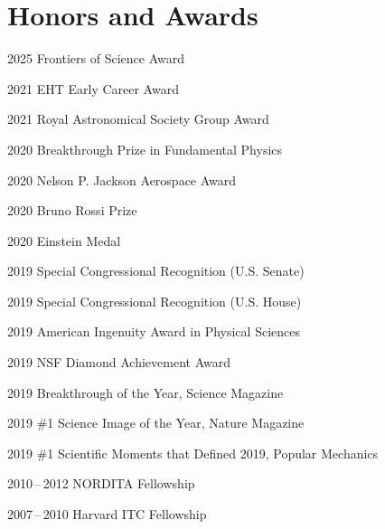 \section*{Honors and Awards}

\begin{tlist}

\item[2025] Frontiers of Science Award

\item[2021] EHT Early Career Award

\item[2021] Royal Astronomical Society Group Award

\item[2020] Breakthrough Prize in Fundamental Physics

\item[2020] Nelson P. Jackson Aerospace Award

\item[2020] Bruno Rossi Prize

\item[2020] Einstein Medal

\item[2019] Special Congressional Recognition (U.S. Senate)

\item[2019] Special Congressional Recognition (U.S. House)


\item[2019] American Ingenuity Award in Physical Sciences

\item[2019] NSF Diamond Achievement Award

\item[2019] Breakthrough of the Year, Science Magazine

\item[2019] \#1 Science Image of the Year, Nature Magazine

\item[2019] \#1 Scientific Moments that Defined 2019, Popular Mechanics

\item[2010\,--\,2012] NORDITA Fellowship

\item[2007\,--\,2010] Harvard ITC Fellowship

\end{tlist}
